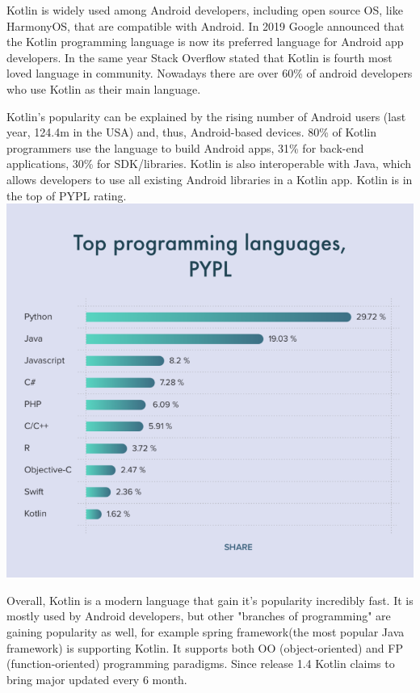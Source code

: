 Kotlin is widely used among Android developers, including open source OS, like HarmonyOS, that are compatible with Android. In 2019 Google announced that the Kotlin programming language is now its preferred language for Android app developers. In the same year Stack Overflow stated that Kotlin is fourth most loved language in community. Nowadays there are over 60\% of android developers who use Kotlin as their main language. 
\par Kotlin's popularity can be explained by the rising number of Android users (last year, 124.4m in the USA) and, thus, Android-based devices. 80\% of Kotlin programmers use the language to build Android apps, 31\% for back-end applications, 30\% for SDK/libraries.
Kotlin is also interoperable with Java, which allows developers to use all existing Android libraries in a Kotlin app. Kotlin is in the top of PYPL rating.
\newline
\includegraphics[scale =0.65]{wp/pictures/kotlinRating.png}
\newline
\par Overall, Kotlin is a modern language that gain it's popularity incredibly fast. It is mostly used by Android developers, but other "branches of programming" are gaining popularity as well, for example spring framework(the most popular Java framework) is supporting Kotlin. It supports both OO (object-oriented) and FP (function-oriented) programming paradigms. Since release 1.4 Kotlin claims to bring major updated every 6 month.